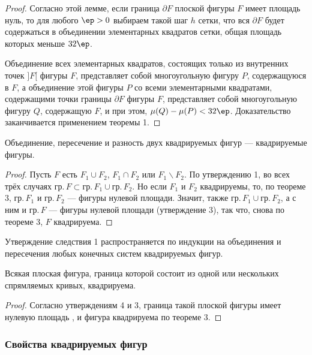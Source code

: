 \documentclass[a4paper]{article}
\begin{document}
\begin{proof}
Согласно этой лемме, если граница $\partial F$ плоской фигуры $F$
имеет площадь нуль, то для любого $\ep>0$ выбираем такой шаг $h$
сетки, что вся $\partial F$ будет содержаться в объединении
элементарных квадратов сетки, общая площадь которых меньше $32\ep$.

Объединение всех элементарных квадратов, состоящих только из
внутренних точек $]F[$ фигуры $F$, представляет собой многоугольную
фигуру $P$, содержащуюся в $F$, а объединение этой фигуры $P$ со
всеми элементарными квадратами, содержащими точки границы $\partial
F$ фигуры $F$, представляет собой многоугольную фигуру $Q$,
содержащую $F$, и при этом, $\mu(Q)-\mu(P) < 32\ep$. Доказательство
заканчивается применением теоремы 1.
\end{proof}

\begin{imp}
Объединение, пересечение и разность двух квадрируемых фигур ---
квадрируемые фигуры.
\end{imp}

\begin{proof}
Пусть $F$ есть $F_1\cup F_2$, $F_1\cap F_2$ или $F_1\backslash F_2$.
По утверждению 1, во всех трёх случаях $гр.\, F \subset гр. \, F_1
\cup гр. \, F_2$. Но если $F_1$ и $F_2$ квадрируемы, то, по теореме
3, $гр.\,F_1$ и $гр.\,F_2$ --- фигуры нулевой площади. Значит, также
$гр.\,F_1 \cup гр.\,F_2$, а с ним и $гр.\,F$ --- фигуры нулевой
площади (утверждение 3), так что, снова по теореме 3, $F$
квадрируема.
\end{proof}

\begin{note}
Утверждение следствия 1 распространяется по индукции на объединения
и пересечения любых конечных систем квадрируемых фигур.
\end{note}

\begin{imp}
Всякая плоская фигура, граница которой состоит из одной или
нескольких спрямляемых кривых, квадрируема.
\end{imp}

\begin{proof}
Согласно утверждениям 4 и 3, граница такой плоской фигуры имеет
нулевую площадь , и фигура квадрируема по теореме 3.
\end{proof}

\subsubsection{Свойства квадрируемых фигур}
\end{document}
